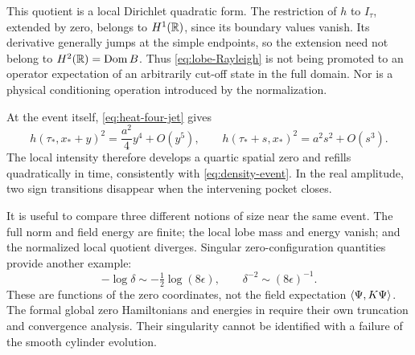 This quotient is a local Dirichlet quadratic form. The restriction of
\(h\) to \(I_\tau\), extended by zero, belongs to \(H^1(\mathbb R)\), since its
boundary values vanish. Its derivative generally jumps at the simple
endpoints, so the extension need not belong to \(H^2(\mathbb R)=\operatorname{Dom} B\).
Thus \eqref{eq:lobe-Rayleigh} is not being promoted to an operator
expectation of an arbitrarily cut-off state in the full domain.
Nor is a physical conditioning operation introduced by the
normalization.

At the event itself, \eqref{eq:heat-four-jet} gives
\begin{equation}\label{eq:local-density-scales}
 h(\tau_*,x_*+y)^2=\frac{a^2}{4}y^4+O(y^5),\qquad
 h(\tau_*+s,x_*)^2=a^2s^2+O(s^3).
\end{equation}
The local intensity therefore develops a quartic spatial zero and
refills quadratically in time, consistently with
\eqref{eq:density-event}. In the real amplitude, two sign transitions
disappear when the intervening pocket closes.

It is useful to compare three different notions of size near the same
event. The full norm and field energy are finite; the local lobe mass
and energy vanish; and the normalized local quotient diverges. Singular
zero-configuration quantities provide another example:
\[
 -\log\delta\sim-\tfrac12\log(8\epsilon),\qquad
 \delta^{-2}\sim(8\epsilon)^{-1}.
\]
These are functions of the zero coordinates, not the field expectation
\(\left\langle\Psi,K\Psi\right\rangle\). The formal global zero Hamiltonians and
energies in \cite{RodgersTao2020} require their own truncation and
convergence analysis. Their singularity cannot be identified with a
failure of the smooth cylinder evolution.


